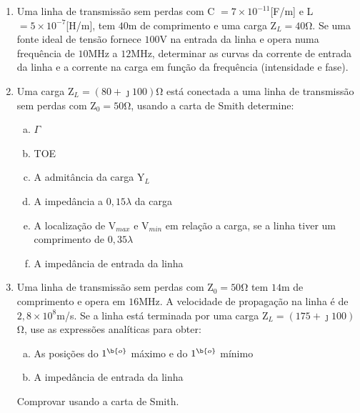 \begin{enumerate}[1.]
\item Uma linha de transmissão sem perdas com C $= 7 \times 10^{-11}$[\si{\farad/\meter}] e L $= 5 \times 10^{-7}$[\si{\henry/\meter}], tem $40$\si{\meter} de comprimento e uma carga Z$_{L} = 40$\si{\ohm}. Se uma fonte ideal de tensão fornece $100$\si{\volt} na entrada da linha e opera numa frequência de $10$\si{\mega\hertz} a $12$\si{\mega\hertz}, determinar as curvas da corrente de entrada da linha e a corrente na carga em função da frequência (intensidade e fase).
\item Uma carga Z$_{L} = (80 + \jmath 100)$\si{\ohm} está conectada a uma linha de transmissão sem perdas com Z$_{0} = 50$\si{\ohm}, usando a carta de Smith determine:

\begin{enumerate}[a.]
  \setlength\itemindent{15pt} \item $\Gamma$
  \setlength\itemindent{15pt} \item TOE
  \setlength\itemindent{15pt} \item A admitância da carga Y$_{L}$
  \setlength\itemindent{15pt} \item A impedância a $0,15 \lambda$ da carga
  \setlength\itemindent{15pt} \item A localização de V$_{max}$ e V$_{min}$ em relação a carga, se a linha tiver um comprimento de $0,35 \lambda$
  \setlength\itemindent{15pt} \item A impedância de entrada da linha
\end{enumerate}
\item Uma linha de transmissão sem perdas com Z$_{0} = 50$\si{\ohm} tem $14$\si{\meter} de comprimento e opera em $16$\si{\mega\hertz}. A velocidade de propagação na linha é de $2,8 \times 10^{8}$\si{\meter/\second}. Se a linha está terminada por uma carga Z$_{L} = (175 + \jmath 100)$\si{\ohm}, use as expressões analíticas para obter:
\begin{enumerate}[a.]
  \setlength\itemindent{15pt} \item As posições do $1^{\b{o}}$ máximo e do $1^{\b{o}}$ mínimo
  \setlength\itemindent{15pt} \item A impedância de entrada da linha
\end{enumerate}
Comprovar usando a carta de Smith.


\end{enumerate}
